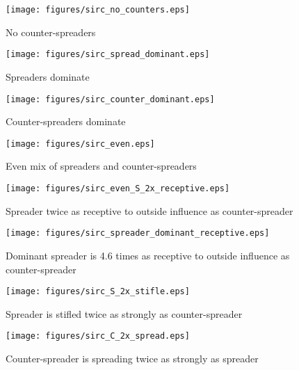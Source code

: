 \begin{figure}[!htbp] \centering
  \texttt{[image: figures/sirc\_no\_counters.eps]}
  \caption{No counter-spreaders}
  \label{fig:sirc_no_counters}
\end{figure}

\begin{figure}[!htbp] \centering
  \texttt{[image: figures/sirc\_spread\_dominant.eps]}
  \caption{Spreaders dominate}
  \label{fig:sirc_spread_dominant}
\end{figure}

\begin{figure}[!htbp] \centering
  \texttt{[image: figures/sirc\_counter\_dominant.eps]}
  \caption{Counter-spreaders dominate}
  \label{fig:sirc_counter_dominant}
\end{figure}

\begin{figure}[!htbp] \centering
  \texttt{[image: figures/sirc\_even.eps]}
  \caption{Even mix of spreaders and counter-spreaders}
  \label{fig:sirc_even}
\end{figure}

\begin{figure}[!htbp] \centering
  \texttt{[image: figures/sirc\_even\_S\_2x\_receptive.eps]}
  \caption{Spreader twice as receptive to outside influence as counter-spreader}
  \label{fig:sirc_even_S_2x_receptive}
\end{figure}

\begin{figure}[!htbp] \centering
  \texttt{[image: figures/sirc\_spreader\_dominant\_receptive.eps]}
  \caption{Dominant spreader is 4.6 times as receptive to outside influence as counter-spreader}
  \label{fig:sirc_spreader_dominant_receptive}
\end{figure}

\begin{figure}[!htbp] \centering
  \texttt{[image: figures/sirc\_S\_2x\_stifle.eps]}
  \caption{Spreader is stifled twice as strongly as counter-spreader}
  \label{fig:sirc_S_2x_stifle}
\end{figure}

\begin{figure}[!htbp] \centering
  \texttt{[image: figures/sirc\_C\_2x\_spread.eps]}
  \caption{Counter-spreader is spreading twice as strongly as spreader}
  \label{fig:sirc_C_2x_spread}
\end{figure}

